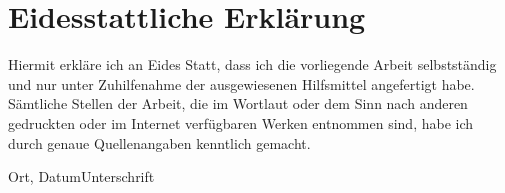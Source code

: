 \section{Eidesstattliche Erklärung}
Hiermit erkläre ich an Eides Statt, dass ich die vorliegende Arbeit selbstständig und nur unter Zuhilfenahme der ausgewiesenen Hilfsmittel angefertigt habe.  Sämtliche  Stellen  der  Arbeit,  die  im  Wortlaut  oder dem  Sinn  nach  anderen  gedruckten  oder im  Internet  verfügbaren  Werken  entnommen  sind,  habe  ich  durch  genaue  Quellenangaben kenntlich gemacht. 

\vspace{2em}


Ort, Datum\hfill Unterschrift 